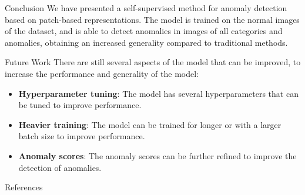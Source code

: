 \documentclass{beamer}
\begin{document}
\begin{frame}{Conclusion}
      We have presented a self-supervised method for anomaly detection based
 on patch-based representations. The model is trained on the normal images
  of the dataset, and is able to detect 
  anomalies in images of all categories and anomalies, obtaining an increased 
  generality compared to traditional methods.
\end{frame}
\begin{frame}{Future Work}
      There are still several aspects of the model that can be improved, to 
      increase the performance and generality of the model:
      \begin{itemize}
              \item \textbf{Hyperparameter tuning}: The model has several hyperparameters
               that can be tuned to improve performance.
              \item \textbf{Heavier training}: The model can be trained for longer
               or with a larger batch size to improve performance.
               \item \textbf{Anomaly scores}: The anomaly scores can be further refined
                to improve the detection of anomalies.
                \end{itemize}
\end{frame}

\begin{frame}{References}
\printbibliography
\end{frame}


\backmatter
\end{document}
